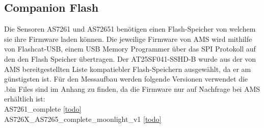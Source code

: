\subsection{Companion Flash}
Die Sensoren AS7261 und AS72651 benötigen einen Flash-Speicher von welchem sie ihre Firmware laden können.
Die jeweilige Firmware von AMS wird mithilfe von Flashcat-USB, einem USB Memory Programmer über das SPI Protokoll auf den den Flash Speicher übertragen.
Der AT25SF041-SSHD-B wurde aus der von AMS bereitgestellten Liste kompatiebler Flash-Speichern ausgewählt, da er am günstigsten ist. 
Für den Messaufbau werden folgende Versionen verwendet die .bin Files sind im Anhang zu finden, da die Firmware nur auf Nachfrage bei AMS erhältlich ist:\\
AS7261\_complete \ref{todo}\\
AS726X\_AS7265\_complete\_moonlight\_v1 \ref{todo}



